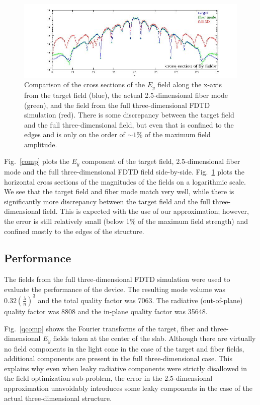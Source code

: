 \begin{figure}[hbt]
\centering\includegraphics[width=\textwidth]{p2/the_xsec}
\caption{Comparison of the cross sections of the $E_y$ field along the x-axis from the target field (blue), the actual 2.5-dimensional fiber mode (green), and the field from the full three-dimensional FDTD simulation (red). There is some discrepancy between the target field and the full three-dimensional field, but even that is confined to the edges and is only on the order of $\sim 1\%$ of the maximum field amplitude.}\label{xsec}
\end{figure}
Fig.~\ref{comp} plots the $E_y$ component of the target field, 2.5-dimensional fiber mode and the full three-dimensional FDTD field side-by-side. Fig.~\ref{xsec} plots the horizontal cross sections of the magnitudes of the fields on a logarithmic scale. We see that the target field and fiber mode match very well, while there is significantly more discrepancy between the target field and the full three-dimensional field. This is expected with the use of our approximation; however, the error is still relatively small (below 1\% of the maximum field strength) and confined mostly to the edges of the structure.

\subsection{Performance}
The fields from the full three-dimensional FDTD simulation were used to evaluate the performance of the device. The resulting mode volume was $0.32 (\frac{\lambda}{n})^3$ and the total quality factor was 7063. The radiative (out-of-plane) quality factor was 8808 and the in-plane quality factor was 35648.

Fig.~\ref{qcomp} shows the Fourier transforms of the target, fiber and three-dimensional $E_y$ fields taken at the center of the slab. Although there are virtually no field components in the light cone in the case of the target and fiber fields, additional components are present in the full three-dimensional case. This explains why even when leaky radiative components were strictly disallowed in the field optimization sub-problem, the error in the 2.5-dimensional approximation unavoidably introduces some leaky components in the case of the actual three-dimensional structure.

